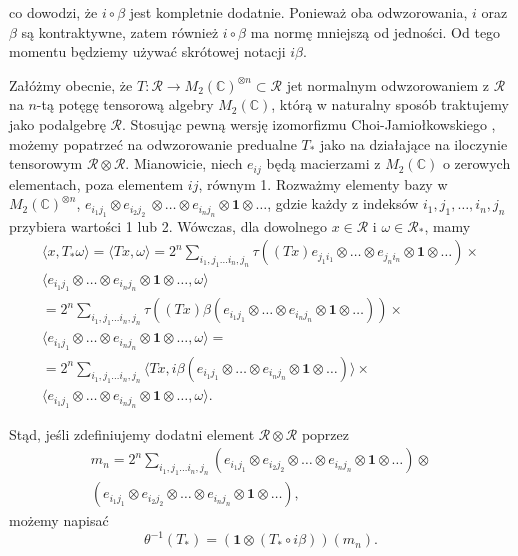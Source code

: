 co dowodzi, że $i \circ \beta$ jest kompletnie dodatnie.
Ponieważ oba odwzorowania, $i$ oraz $\beta$ są kontraktywne,
zatem również $i\circ\beta$ ma normę mniejszą od jedności.
Od tego momentu będziemy używać skrótowej notacji $i\beta$.

Załóżmy obecnie, że
$T: \mathcal{R} \rightarrow M_{2}(\mathbb{C})^{\otimes n}\subset \mathcal{R}$
jet normalnym odwzorowaniem z $\mathcal{R}$ na $n$-tą potęgę tensorową algebry
$M_{2}(\mathbb{C})$, którą w naturalny sposób traktujemy jako podalgebrę $\mathcal{R}$.
Stosując pewną wersję izomorfizmu Choi-Jamiołkowskiego
\cite{choi1975completely,jamiolkowski1974effective},
możemy popatrzeć na odwzorowanie predualne $T_{*}$ jako na działające na
iloczynie tensorowym $\mathcal{R}\otimes\mathcal{R}$.
Mianowicie, niech $e_{ij}$ będą macierzami z $M_{2}(\mathbb{C})$
o zerowych elementach, poza elementem $ij$, równym 1.
Rozważmy elementy bazy w
$M_{2}(\mathbb{C})^{\otimes n}$,
$e_{i_{1} j_{1}} \otimes e_{i_{2} j_{2}} \
\otimes \ldots \otimes e_{i_{n} j_{n}} \otimes \mathbf{1} \otimes \ldots$,
gdzie każdy z indeksów $i_{1}, j_{1}, \ldots, i_{n}, j_{n}$
przybiera wartości 1 lub 2.
Wówczas, dla dowolnego $x \in \mathcal{R}$ i
$\omega \in \mathcal{R}_{*}$, mamy
\begin{multline}
\langle x, T_{*} \omega \rangle =\langle T x,  \omega \rangle
=  2^{n} \sum \limits_{i_{1}, j_{1}\ldots i_{n}, j_{n}}
\tau \left((Tx) e_{j_{1} i_{1}} \otimes \ldots \otimes e_{j_{n} i_{n}}
\otimes \mathbf{1} \otimes \ldots \right) \times \\
\langle e_{i_{1} j_{1}} \otimes \ldots \otimes e_{i_{n} j_{n}}
\otimes \mathbf{1} \otimes \ldots ,\omega \rangle\\
= 2^{n} \sum \limits_{i_{1}, j_{1}\ldots i_{n}, j_{n}} \tau \left((Tx)
\beta (e_{i_{1} j_{1}} \otimes \ldots \otimes e_{i_{n} j_{n}}
\otimes \mathbf{1} \otimes \ldots ) \right) \times \\
\langle e_{i_{1} j_{1}} \otimes \ldots \otimes e_{i_{n}j_{n}}
\otimes \mathbf{1} \otimes \ldots  , \omega \rangle = \\
=  2^{n} \sum \limits_{i_{1}, j_{1}\ldots i_{n}, j_{n}}
\langle Tx ,i \beta (e_{i_{1} j_{1}} \otimes \ldots \otimes e_{i_{n} j_{n}}
\otimes \mathbf{1} \otimes \ldots) \rangle\times\\
\langle e_{i_{1} j_{1}} \otimes \ldots \otimes e_{i_{n} j_{n}}
\otimes \mathbf{1} \otimes \ldots,\omega \rangle.
\end{multline}

Stąd, jeśli zdefiniujemy dodatni element $\mathcal{R}\otimes\mathcal{R}$ poprzez
\begin{eqnarray}
m_{n} = 2^{n} \sum \limits_{i_{1}, j_{1}\ldots i_{n}, j_{n}}
\left( e_{i_{1} j_{1}} \otimes e_{i_{2} j_{2}} \otimes \ldots \otimes
e_{i_{n} j_{n}} \otimes \mathbf{1} \otimes \ldots \right) \otimes \nonumber\\
\left( e_{i_{1} j_{1}} \otimes e_{i_{2} j_{2}}\otimes \ldots \otimes
e_{i_{n} j_{n}} \otimes \mathbf{1} \otimes \ldots\right),
\end{eqnarray}
możemy napisać
\begin{equation}
\label{eq:thetainverse}
\theta^{-1}(T_{*}) =(\mathbf{1} \otimes (T_{*} \circ i \beta)) (m_{n}).
\end{equation}

